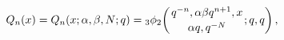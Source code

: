 \[Q_{n}(x)=\mathop{Q_{n}\/}\nolimits\!\left(x;\alpha,\beta,N;q\right)=\mathop{{{%
}_{3}\phi_{2}}\/}\nolimits\!\left({q^{-n},\alpha\beta q^{n+1},x\atop\alpha q,q%
^{-N}};q,q\right),\]